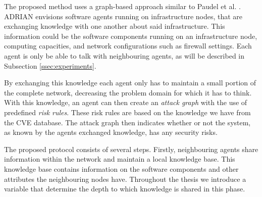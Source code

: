 The proposed method uses a graph-based approach similar to Paudel et al. \cite{paudel2019detecting}. ADRIAN envisions software agents running on infrastructure nodes, that are exchanging knowledge with one another about said infrastructure. This information could be the software components running on an infrastructure node, computing capacities, and network configurations such as firewall settings. Each agent is only be able to talk with neighbouring agents, as will be described in Subsection \ref{ssec:experiments}.

By exchanging this knowledge each agent only has to maintain a small portion of the complete network, decreasing the problem domain for which it has to think. With this knowledge, an agent can then create an \emph{attack graph} with the use of predefined \emph{risk rules}. These risk rules are based on the knowledge we have from the CVE database. The attack graph then indicates whether or not the system, as known by the agents exchanged knowledge, has any security risks.




The proposed protocol consists of several steps. Firstly, neighbouring agents share information within the network and maintain a local knowledge base. This knowledge base contains information on the software components and other attributes the neighbouring nodes have. Throughout the thesis we introduce a variable that determine the depth to which knowledge is shared in this phase. 

